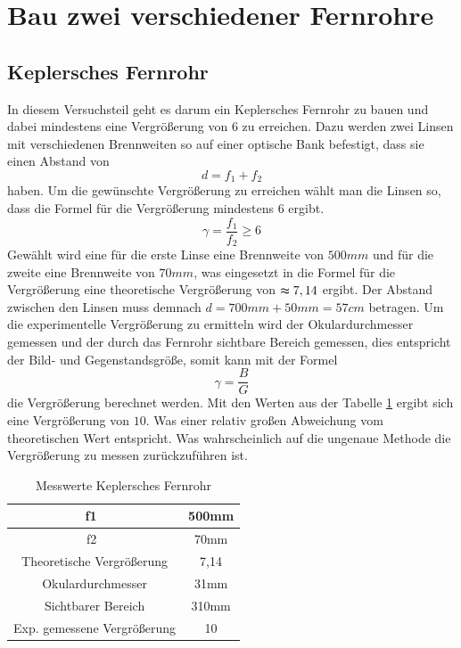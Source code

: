 \section{Bau zwei verschiedener Fernrohre}
\subsection{Keplersches Fernrohr}

In diesem Versuchsteil geht es darum ein Keplersches Fernrohr zu bauen und dabei mindestens eine Vergrößerung von 6 zu erreichen. Dazu werden zwei Linsen mit verschiedenen Brennweiten so auf einer optische Bank befestigt, dass sie einen Abstand von $$ d = f_1 + f_2 $$ haben. Um die gewünschte Vergrößerung zu erreichen wählt man die Linsen so, dass die Formel für die Vergrößerung mindestens 6 ergibt. $$  \gamma = \frac{f_1}{f_2} \geqslant 6$$Gewählt wird eine für die erste Linse eine Brennweite von $500mm$ und für die zweite eine Brennweite von $70mm$, was eingesetzt in die Formel für die Vergrößerung eine theoretische Vergrößerung von $\thickapprox 7,14 $ ergibt. Der Abstand zwischen den Linsen muss demnach $d = 700mm + 50mm = 57cm$ betragen.
Um die experimentelle Vergrößerung zu ermitteln wird der Okulardurchmesser gemessen und der durch das Fernrohr sichtbare Bereich gemessen, dies entspricht der Bild- und Gegenstandsgröße, somit kann mit der Formel $$ \gamma = \frac{B}{G} $$ die Vergrößerung berechnet werden. Mit den Werten aus der Tabelle \ref{tab:Tabellekeppler} ergibt sich eine Vergrößerung von $10$. Was einer relativ großen Abweichung vom theoretischen Wert entspricht. Was wahrscheinlich auf die ungenaue Methode die Vergrößerung zu messen zurückzuführen ist.

\begin{table}[h]
    \centering
    \begin{tabular}{|c|c|}
	\hline
	f1\ & 500mm \\
	\hline
	f2\ & 70mm \\
	\hline
	Theoretische Vergrößerung  & 7,14 \\
	\hline
	Okulardurchmesser & 31mm \\
	\hline
	Sichtbarer Bereich & 310mm \\
	\hline
	Exp. gemessene Vergrößerung & 10 \\
	\hline
    \end{tabular}
    \caption{Messwerte Keplersches Fernrohr}
    \label{tab:Tabellekeppler}
\end{table}


